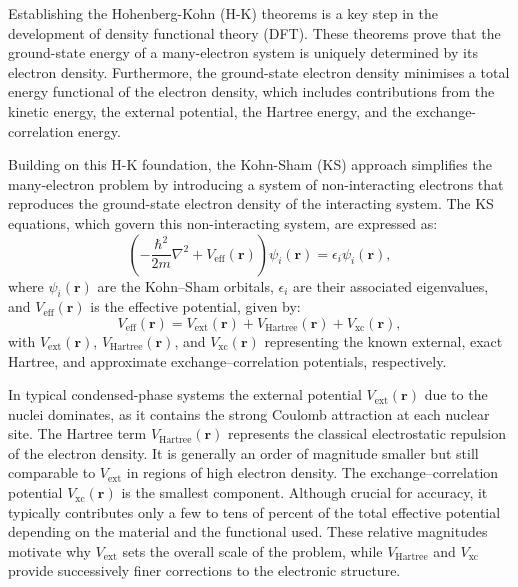 Establishing the Hohenberg-Kohn (H-K) theorems is a key step in the development of density functional theory (DFT).
These theorems prove that the ground-state energy of a many-electron system is uniquely determined by its electron density. 
Furthermore, the ground-state electron density minimises a total energy functional of the electron density, which includes contributions from the kinetic energy, the external potential, the Hartree energy, and the exchange-correlation energy.

Building on this H-K foundation, the Kohn-Sham (KS) approach simplifies the many-electron problem by introducing a system of non-interacting electrons that reproduces the ground-state electron density of the interacting system.
The KS equations, which govern this non-interacting system, are expressed as:
\begin{equation}
\label{equ:2.26}
\left(-\frac{\hbar^2}{2m} \nabla^2 + V_{\text{eff}}(\mathbf{r})\right) \psi_i(\mathbf{r}) = \epsilon_i \psi_i(\mathbf{r}),
\end{equation}
where $\psi_i(\mathbf{r})$ are the Kohn–Sham orbitals, $\epsilon_i$ are their associated eigenvalues, and $V_{\text{eff}}(\mathbf{r})$ is the effective potential, given by:
\begin{equation}
\label{equ:2.27}
V_{\text{eff}}(\mathbf{r}) = V_{\text{ext}}(\mathbf{r}) + V_{\text{Hartree}}(\mathbf{r}) + V_{\text{xc}}(\mathbf{r}),
\end{equation}
with $V_{\text{ext}}(\mathbf{r})$, $V_{\text{Hartree}}(\mathbf{r})$, and $V_{\text{xc}}(\mathbf{r})$ representing the known external, exact Hartree, and approximate exchange–correlation potentials, respectively.

In typical condensed-phase systems the external potential $V_{\text{ext}}(\mathbf{r})$ due to the nuclei dominates, as it contains the strong Coulomb attraction at each nuclear site. 
The Hartree term $V_{\text{Hartree}}(\mathbf{r})$ represents the classical electrostatic repulsion of the electron density.
It is generally an order of magnitude smaller but still comparable to $V_{\text{ext}}$ in regions of high electron density. 
The exchange–correlation potential $V_{\text{xc}}(\mathbf{r})$ is the smallest component.
Although crucial for accuracy, it typically contributes only a few to tens of percent of the total effective potential depending on the material and the functional used. 
These relative magnitudes motivate why $V_{\text{ext}}$ sets the overall scale of the problem, while $V_{\text{Hartree}}$ and $V_{\text{xc}}$ provide successively finer corrections to the electronic structure.

